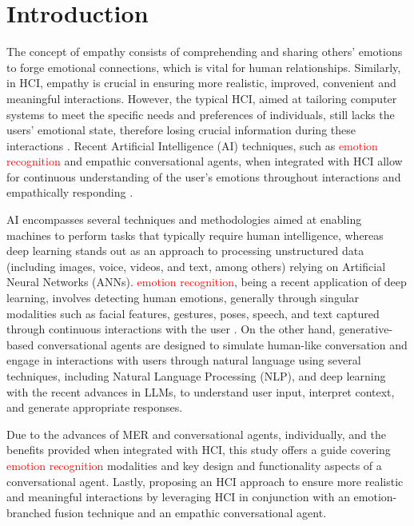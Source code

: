 \documentclass[runningheads]{llncs}
\begin{document}
\section{Introduction}

The concept of empathy consists of comprehending and sharing others' emotions to forge emotional connections, which is vital for human relationships. Similarly, in HCI, empathy is crucial in ensuring more realistic, improved, convenient and meaningful interactions. However, the typical HCI, aimed at tailoring computer systems to meet the specific needs and preferences of individuals, still lacks the users' emotional state, therefore losing crucial information during these interactions \cite{jaiswal_facial_2020}.  Recent Artificial Intelligence (AI) techniques, such as \textcolor{red}{emotion recognition} and empathic conversational agents, when integrated with HCI allow for continuous understanding of the user's emotions throughout interactions and empathically responding \cite{santos_approaches_2018}.

AI encompasses several techniques and methodologies aimed at enabling machines to perform tasks that typically require human intelligence, whereas deep learning stands out as an approach to processing unstructured data (including images, voice, videos, and text, among others) relying on Artificial Neural Networks (ANNs). \textcolor{red}{emotion recognition}, being a recent application of deep learning, involves detecting human emotions, generally through singular modalities such as facial features, gestures, poses, speech, and text captured through continuous interactions with the user \cite{alrowais_modified_2023}. On the other hand, generative-based conversational agents are designed to simulate human-like conversation and engage in interactions with users through natural language using several techniques, including Natural Language Processing (NLP), and deep learning with the recent advances in LLMs, to understand user input, interpret context, and generate appropriate responses.

Due to the advances of MER and conversational agents, individually, and the benefits provided when integrated with HCI, this study offers a guide covering \textcolor{red}{emotion recognition} modalities and key design and functionality aspects of a conversational agent. Lastly, proposing an HCI approach to ensure more realistic and meaningful interactions by leveraging HCI in conjunction with an emotion-branched fusion technique and an empathic conversational agent.
 
\end{document}
